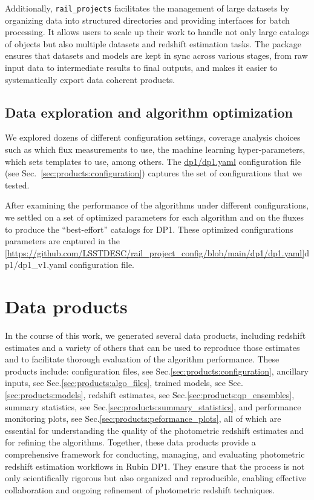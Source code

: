 Additionally, \texttt{rail\_projects} facilitates the management of large datasets by organizing data into structured directories and providing interfaces for batch processing.  It allows users to scale up their work to handle not only large catalogs of objects but also multiple datasets and redshift estimation tasks.  The package ensures that datasets and models are kept in sync across various stages, from raw input data to intermediate results to final outputs, and makes it easier to systematically export data coherent products.


\subsection{Data exploration and algorithm optimization}
\label{sec:method:optimization}

We explored dozens of different configuration settings, coverage analysis choices such as which flux measurements to use, the machine learning hyper-parameters, which sets templates to use, among others.   The \href{https://github.com/LSSTDESC/rail_project_config/blob/main/dp1/dp1.yaml}{dp1/dp1.yaml} configuration file (see Sec.~\ref{sec:products:configuration}) captures the set of configurations that we tested.  

After examining the performance of the algorithms under different configurations, we settled on a set of optimized parameters for each algorithm and on the  fluxes to produce the ``best-effort'' catalogs for DP1.   These optimized configurations parameters are captured in the \ref{https://github.com/LSSTDESC/rail_project_config/blob/main/dp1/dp1.yaml}{dp1/dp1\_v1.yaml} configuration file.


\section{Data products}
\label{sec:products:0}

In the course of this work, we generated several data products, including redshift estimates and a variety of others that can be used to reproduce those estimates and to facilitate thorough evaluation of the algorithm performance.  These products include: configuration files, see Sec.\ref{sec:products:configuration}, ancillary inputs, see Sec.\ref{sec:products:algo_files}, trained models, see Sec.\ref{sec:products:models}, redshift estimates, see Sec.\ref{sec:products:qp_ensembles}, summary statistics,  see Sec.\ref{sec:products:summary_statistics}, and performance monitoring plots, see Sec.\ref{sec:products:peformance_plots}, all of which are essential for understanding the quality of the photometric redshift estimates and for refining the algorithms.   Together, these data products provide a comprehensive framework for conducting, managing, and evaluating photometric redshift estimation workflows in Rubin DP1.  They ensure that the process is not only scientifically rigorous but also organized and reproducible, enabling effective collaboration and ongoing refinement of photometric redshift techniques.



